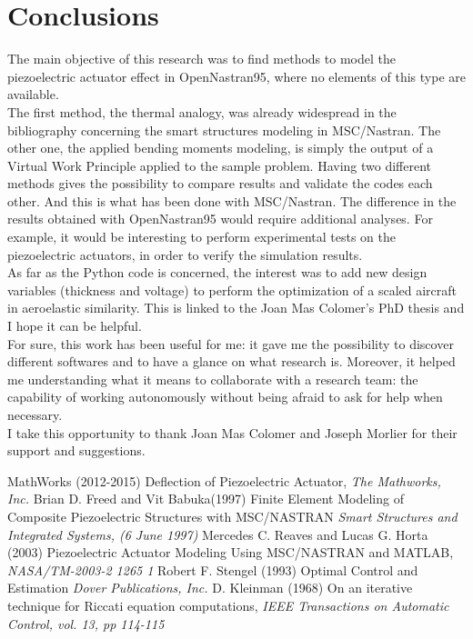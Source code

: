 \documentclass[twocolumn,a4paper,10pt,english]{article}
\begin{document}
\section{Conclusions}
The main objective of this research was to find methods to model the piezoelectric actuator effect in OpenNastran95, where no elements of this type are available.\\
The first method, the thermal analogy, was already widespread in the bibliography concerning the smart structures modeling in MSC/Nastran. The other one, the applied bending moments modeling, is simply the output of a Virtual Work Principle applied to the sample problem. Having two different methods gives the possibility to compare results and validate the codes each other. And this is what has been done with MSC/Nastran. The difference in the results obtained with OpenNastran95 would require additional analyses. For example, it would be interesting to perform experimental tests on the piezoelectric actuators, in order to verify the simulation results.\\
As far as the Python code is concerned, the interest was to add new design variables (thickness and voltage) to perform the optimization of a scaled aircraft in aeroelastic similarity. This is linked to the Joan Mas Colomer's PhD thesis and I hope it can be helpful.\\
For sure, this work has been useful for me: it gave me the possibility to discover different softwares and to have a glance on what research is. Moreover, it helped me understanding what it means to collaborate with a research team: the capability of working autonomously without being afraid to ask for help when necessary.\\
I take this opportunity to thank Joan Mas Colomer and Joseph Morlier for their support and suggestions. 
    \clearpage

\footnotesize

\begin{thebibliography}{99} %
	 MathWorks (2012-2015)
	\newblock Deflection of Piezoelectric Actuator,
	\newblock \emph{The Mathworks, Inc.} 
	Brian D. Freed and Vit Babuka(1997)
	\newblock Finite Element Modeling of Composite Piezoelectric Structures with
	MSC/NASTRAN
	\newblock \emph{Smart Structures and Integrated Systems, (6 June 1997)}
	 Mercedes C. Reaves and Lucas G. Horta (2003)
	\newblock Piezoelectric Actuator Modeling Using
	MSC/NASTRAN and MATLAB,
	\newblock \emph{NASA/TM-2003-2 1265 1} 
	 Robert F. Stengel (1993)
	\newblock Optimal Control and Estimation
	\newblock \emph{Dover Publications, Inc.}
	D. Kleinman (1968)
	\newblock On an iterative technique for Riccati equation computations,
	\newblock \emph{IEEE Transactions on
		Automatic Control, vol. 13, pp 114-115}
\end{thebibliography}
\end{document}
